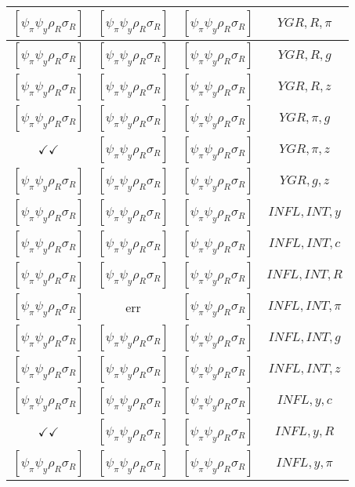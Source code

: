 \documentclass[a4paper,10pt]{article}
\begin{document}
\begin{longtable}{|c|c|c|c|}
\hline
$[\psi_\pi \psi_y \rho_R \sigma_R ]$ & $[\psi_\pi \psi_y \rho_R \sigma_R ]$ & $[\psi_\pi \psi_y \rho_R \sigma_R ]$ & ${YGR},{R},{\pi}$ \\
\hline
$[\psi_\pi \psi_y \rho_R \sigma_R ]$ & $[\psi_\pi \psi_y \rho_R \sigma_R ]$ & $[\psi_\pi \psi_y \rho_R \sigma_R ]$ & ${YGR},{R},{g}$ \\
\hline
$[\psi_\pi \psi_y \rho_R \sigma_R ]$ & $[\psi_\pi \psi_y \rho_R \sigma_R ]$ & $[\psi_\pi \psi_y \rho_R \sigma_R ]$ & ${YGR},{R},{z}$ \\
\hline
$[\psi_\pi \psi_y \rho_R \sigma_R ]$ & $[\psi_\pi \psi_y \rho_R \sigma_R ]$ & $[\psi_\pi \psi_y \rho_R \sigma_R ]$ & ${YGR},{\pi},{g}$ \\
\hline
$\checkmark\checkmark$ & $[\psi_\pi \psi_y \rho_R \sigma_R ]$ & $[\psi_\pi \psi_y \rho_R \sigma_R ]$ & ${YGR},{\pi},{z}$ \\
\hline
$[\psi_\pi \psi_y \rho_R \sigma_R ]$ & $[\psi_\pi \psi_y \rho_R \sigma_R ]$ & $[\psi_\pi \psi_y \rho_R \sigma_R ]$ & ${YGR},{g},{z}$ \\
\hline
$[\psi_\pi \psi_y \rho_R \sigma_R ]$ & $[\psi_\pi \psi_y \rho_R \sigma_R ]$ & $[\psi_\pi \psi_y \rho_R \sigma_R ]$ & ${INFL},{INT},{y}$ \\
\hline
$[\psi_\pi \psi_y \rho_R \sigma_R ]$ & $[\psi_\pi \psi_y \rho_R \sigma_R ]$ & $[\psi_\pi \psi_y \rho_R \sigma_R ]$ & ${INFL},{INT},{c}$ \\
\hline
$[\psi_\pi \psi_y \rho_R \sigma_R ]$ & $[\psi_\pi \psi_y \rho_R \sigma_R ]$ & $[\psi_\pi \psi_y \rho_R \sigma_R ]$ & ${INFL},{INT},{R}$ \\
\hline
$[\psi_\pi \psi_y \rho_R \sigma_R ]$ & err & $[\psi_\pi \psi_y \rho_R \sigma_R ]$ & ${INFL},{INT},{\pi}$ \\
\hline
$[\psi_\pi \psi_y \rho_R \sigma_R ]$ & $[\psi_\pi \psi_y \rho_R \sigma_R ]$ & $[\psi_\pi \psi_y \rho_R \sigma_R ]$ & ${INFL},{INT},{g}$ \\
\hline
$[\psi_\pi \psi_y \rho_R \sigma_R ]$ & $[\psi_\pi \psi_y \rho_R \sigma_R ]$ & $[\psi_\pi \psi_y \rho_R \sigma_R ]$ & ${INFL},{INT},{z}$ \\
\hline
$[\psi_\pi \psi_y \rho_R \sigma_R ]$ & $[\psi_\pi \psi_y \rho_R \sigma_R ]$ & $[\psi_\pi \psi_y \rho_R \sigma_R ]$ & ${INFL},{y},{c}$ \\
\hline
$\checkmark\checkmark$ & $[\psi_\pi \psi_y \rho_R \sigma_R ]$ & $[\psi_\pi \psi_y \rho_R \sigma_R ]$ & ${INFL},{y},{R}$ \\
\hline
$[\psi_\pi \psi_y \rho_R \sigma_R ]$ & $[\psi_\pi \psi_y \rho_R \sigma_R ]$ & $[\psi_\pi \psi_y \rho_R \sigma_R ]$ & ${INFL},{y},{\pi}$ \\

\end{longtable}
\end{document}
